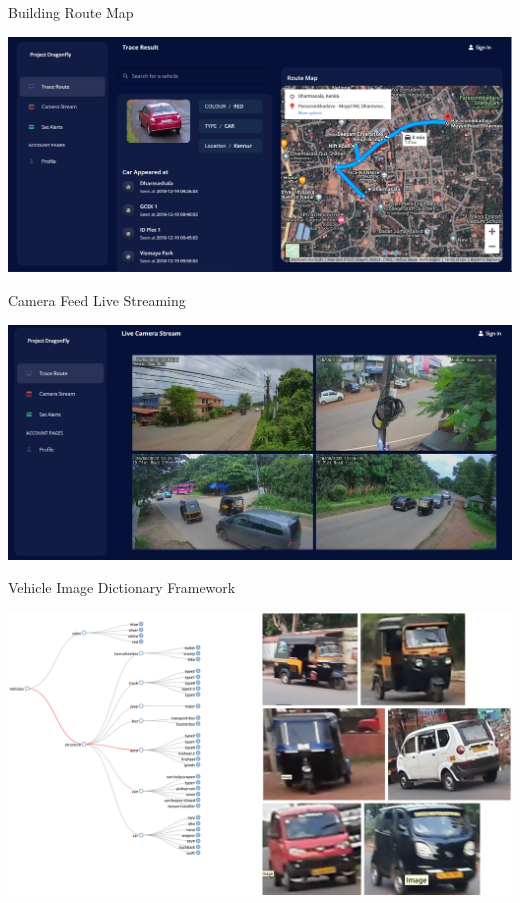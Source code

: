 \documentclass{beamer}
\begin{document}
	 \begin{frame}{Building Route Map}
		\begin{center}
			\includegraphics[width=\linewidth]{res/result.png}
		\end{center}
	\end{frame}

	\begin{frame}{Camera Feed Live Streaming}
		\begin{center}
			\includegraphics[width=\linewidth]{res/live_stream.png}
		\end{center}
	\end{frame}

	\begin{frame}{Vehicle Image Dictionary Framework}
		\begin{center}
			\includegraphics[width=\linewidth]{res/image_dictionary.png}
		\end{center}
	\end{frame}
\end{document}
